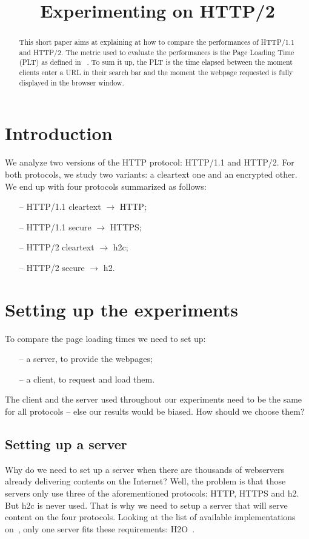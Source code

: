 \documentclass[12pt, notitlepage]{article}
\begin{document}


\title{Experimenting on HTTP/2}
\maketitle

\begin{abstract}
This short paper aims at explaining at how to compare the performances
of HTTP/1.1 and HTTP/2.
The metric used to evaluate the performances is the Page Loading Time
(PLT) as defined in ~\cite{w3c}.
To sum it up, the PLT is the time elapsed between the moment clients
enter a URL in their search bar and the moment the webpage requested is
fully displayed in the browser window.
\end{abstract}

\section{Introduction}
We analyze two versions of the HTTP protocol: HTTP/1.1 and HTTP/2.
For both protocols, we study two variants: a cleartext one and an
encrypted other. We end up with four protocols summarized as follows:
\begin{itemize}[noitemsep]
	\item[--] HTTP/1.1 cleartext $\to$ HTTP;
	\item[--] HTTP/1.1 secure $\to$ HTTPS;
	\item[--] HTTP/2 cleartext $\to$ h2c;
	\item[--] HTTP/2 secure $\to$ h2.
\end{itemize}
\newpage

\section{Setting up the experiments}
To compare the page loading times we need to set up: 
\begin{itemize}[noitemsep]
\item[--] a server, to provide the webpages;
\item[--] a client, to request and load them.
\end{itemize}

The client and the server used throughout our experiments need to be the
same for all protocols -- else our results would be biased. How should we
choose them?

\subsection{Setting up a server}
Why do we need to set up a server when there are thousands of webservers
already delivering contents on the Internet? Well, the problem is that
those servers only use three of the aforementioned protocols: HTTP, HTTPS
and h2. But h2c is never used.
That is why we need to setup a server that will serve content on the 
four protocols. 
Looking at the list of available 
implementations on~\cite{implem}, only one server fits these requirements:
H2O~\cite{h2o}.\\
\end{document}
